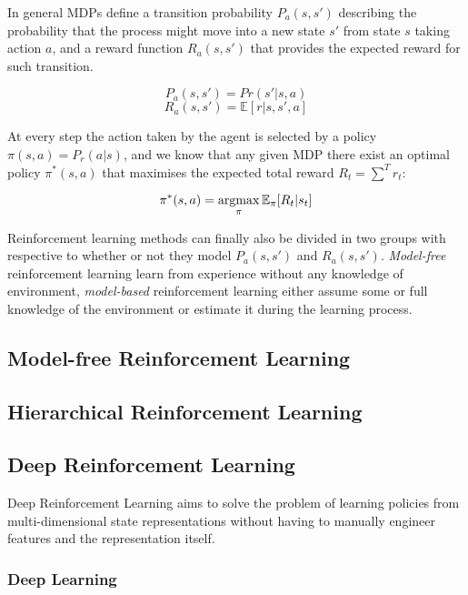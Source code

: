 In general MDPs define a transition probability $P_a(s, s')$ describing the
probability that the process might move into a new state $s'$ from state $s$
taking action $a$, and a reward function $R_a(s, s')$ that provides the expected
reward for such transition.

\begin{equation}
P_a(s, s') = Pr(s' | s, a)
\end{equation}
\begin{equation}
R_a(s, s') = \mathbb{E}[r|s, s', a]
\end{equation}

At every step the action taken by the agent is selected by a policy $\pi(s, a) =
P_r(a | s)$, and we know that any given MDP there exist an optimal policy
$\pi^*(s, a)$ that maximises the expected total reward $R_t = \sum^T{r_t}$:

\begin{equation}
  \pi^*(s, a) = \operatornamewithlimits{argmax}_{\pi} \mathbb{E}_{\pi}[R_t | s_t]
\end{equation}

Reinforcement learning methods can finally also be divided in two groups with
respective to whether or not they model $P_a(s, s')$ and $R_a(s, s')$.
\emph{Model-free} reinforcement learning learn from experience without any
knowledge of environment, \emph{model-based} reinforcement learning either
assume some or full knowledge of the environment or estimate it during the
learning process.


\subsection{Model-free Reinforcement Learning}

\subsection{Hierarchical Reinforcement Learning}

\subsection{Deep Reinforcement Learning}

Deep Reinforcement Learning aims to solve the problem of learning policies from
multi-dimensional state representations without having to manually engineer
features and the representation itself.

\subsubsection{Deep Learning}

